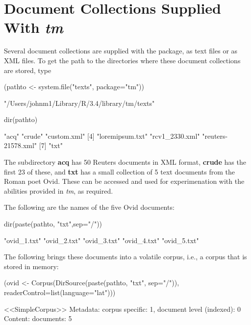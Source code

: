 \section{Document Collections Supplied With {\em tm}}
Several document collections are supplied with the package,
as text files or as XML files.  To get the path to the
directories where these document collections are stored, type
\begin{fullwidth}

\begin{Schunk}
\begin{Sinput}
(pathto <- system.file("texts", package="tm"))
\end{Sinput}
\begin{Soutput}
[1] "/Users/johnm1/Library/R/3.4/library/tm/texts"
\end{Soutput}
\begin{Sinput}
dir(pathto)
\end{Sinput}
\begin{Soutput}
[1] "acq"               "crude"             "custom.xml"       
[4] "loremipsum.txt"    "rcv1_2330.xml"     "reuters-21578.xml"
[7] "txt"              
\end{Soutput}
\end{Schunk}

\end{fullwidth}
The subdirectory \textbf{acq} has 50 Reuters documents in XML format,
\textbf{crude} has the first 23 of these, and \textbf{txt} has a
small collection of 5 text documents from the Roman poet Ovid.
These can be accessed and used for experimenation with the abilities
provided in {\em tm}, as required.

The following are the names of the five Ovid documents:
\begin{fullwidth}

\begin{Schunk}
\begin{Sinput}
dir(paste(pathto, "txt",sep="/"))
\end{Sinput}
\begin{Soutput}
[1] "ovid_1.txt" "ovid_2.txt" "ovid_3.txt" "ovid_4.txt" "ovid_5.txt"
\end{Soutput}
\end{Schunk}

\end{fullwidth}

The following brings these documents into a volatile corpus, i.e.,
a corpus that is stored in memory:
\begin{Schunk}
\begin{Sinput}
(ovid <-
   Corpus(DirSource(paste(pathto, "txt", sep="/")),
          readerControl=list(language="lat")))
\end{Sinput}
\begin{Soutput}
<<SimpleCorpus>>
Metadata:  corpus specific: 1, document level (indexed): 0
Content:  documents: 5
\end{Soutput}
\end{Schunk}

